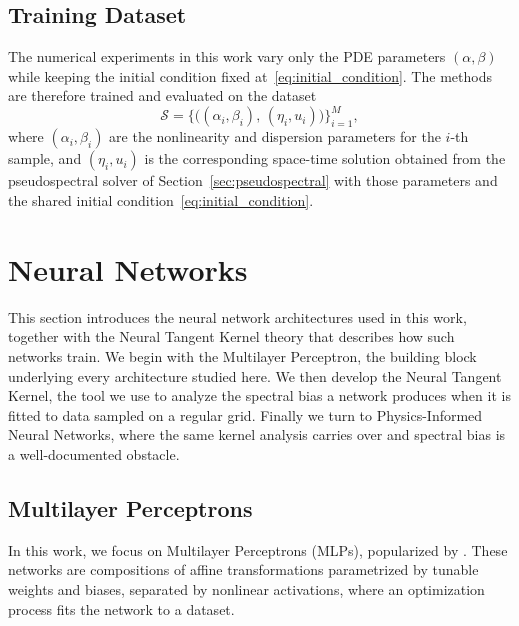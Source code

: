 \subsection{Training Dataset}
\label{sec:dataset}

The numerical experiments in this work vary only the PDE parameters $(\alpha,\beta)$ while keeping the initial condition fixed at~\eqref{eq:initial_condition}. The methods are therefore trained and evaluated on the dataset
\begin{equation}\label{eq:dataset}
    \mathcal{S} = \bigl\{\bigl((\alpha_i,\beta_i),\,(\eta_i,u_i)\bigr)\bigr\}_{i=1}^{M},
\end{equation}
where $(\alpha_i,\beta_i)$ are the nonlinearity and dispersion parameters for the $i$-th sample, and $(\eta_i,u_i)$ is the corresponding space-time solution obtained from the pseudospectral solver of Section~\ref{sec:pseudospectral} with those parameters and the shared initial condition~\eqref{eq:initial_condition}.

\section{Neural Networks}
\label{sec:neural_networks}

This section introduces the neural network architectures used in this work, together with the Neural Tangent Kernel theory that describes how such networks train. We begin with the Multilayer Perceptron, the building block underlying every architecture studied here. We then develop the Neural Tangent Kernel, the tool we use to analyze the spectral bias a network produces when it is fitted to data sampled on a regular grid. Finally we turn to Physics-Informed Neural Networks, where the same kernel analysis carries over and spectral bias is a well-documented obstacle.

\subsection{Multilayer Perceptrons}
\label{subsec:mlp}

In this work, we focus on Multilayer Perceptrons (MLPs), popularized by \textcite{rumelhart1986}. These networks are compositions of affine transformations parametrized by tunable weights and biases, separated by nonlinear activations, where an optimization process fits the network to a dataset.

